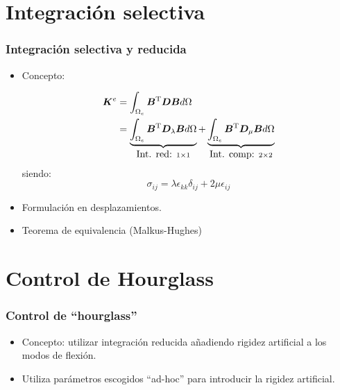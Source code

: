 \documentclass{beamer}
\begin{document}
\section{Integración selectiva}
\begin{frame}
\frametitle{Integración selectiva y reducida}
\begin{itemize}
\item Concepto:

\begin{align*}
\bm{K}^{e}&=\int_{\Omega_{e}} \bm{B}^{\rm T} \bm{D} \bm{B} d \Omega \\
\mbox{}   &=
\underbrace{\int_{\Omega_{e}} \bm{B}^{\rm T} \bm{D}_{\lambda} \bm{B} d \Omega}_{\mbox{Int. red: } 1\times 1}
+
\underbrace{\int_{\Omega_{e}} \bm{B}^{\rm T} \bm{D}_{\mu} \bm{B} d \Omega}_{\mbox{Int. comp: } 2\times 2}
\end{align*}
siendo:
$$\sigma_{ij}=\lambda \epsilon_{kk} \delta_{ij}+
2 \mu \epsilon_{ij}$$

\item Formulación en desplazamientos.

\item Teorema de equivalencia (Malkus-Hughes)
\end{itemize}
\end{frame}
\section{Control de Hourglass}
\begin{frame}
\frametitle{Control de ``hourglass''}
\begin{itemize}
\item Concepto: utilizar integración reducida añadiendo rigidez artificial a
los modos de flexión.
\item Utiliza parámetros escogidos 
``ad-hoc'' para introducir la rigidez artificial.
\end{itemize}
\end{frame}
\end{document}
